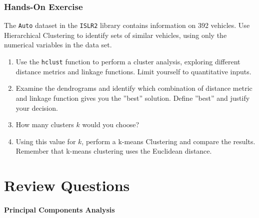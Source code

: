 \begin{tcolorbox}[colback=code]
\subsubsection*{Hands-On Exercise} 
The \texttt{Auto} dataset in the \texttt{ISLR2} library contains information on 392 vehicles. Use Hierarchical Clustering to identify sets of similar vehicles, using only the numerical variables in the data set.

\begin{enumerate}
   \item Use the \texttt{hclust} function to perform a cluster analysis, exploring different distance metrics and linkage functions. Limit yourself to quantitative inputs.
   \item Examine the dendrograms and identify which combination of distance metric and linkage function gives you the ''best'' solution. Define ''best'' and justify your decision.
   \item How many clusters $k$ would you choose?
   \item Using this value for $k$, perform a k-means Clustering and compare the results. Remember that k-means clustering uses the Euclidean distance.
\end{enumerate}
\end{tcolorbox}

\section{Review Questions}

\paragraph*{Principal Components Analysis}

